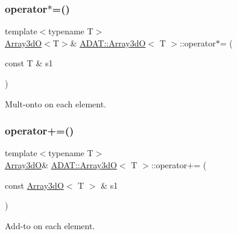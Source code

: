 \subsubsection{\texorpdfstring{operator$\ast$=()}{operator*=()}\hspace{0.1cm}{\footnotesize\ttfamily [6/6]}}
{\footnotesize\ttfamily template$<$typename T$>$ \\
\mbox{\hyperlink{classADAT_1_1Array3dO}{Array3dO}}$<$T$>$\& \mbox{\hyperlink{classADAT_1_1Array3dO}{A\+D\+A\+T\+::\+Array3dO}}$<$ T $>$\+::operator$\ast$= (\begin{DoxyParamCaption}\item[{const T \&}]{s1 }\end{DoxyParamCaption})\hspace{0.3cm}{\ttfamily [inline]}}



Mult-\/onto on each element. 

\mbox{\label{classADAT_1_1Array3dO_a5d72c8e7dd54897fe898b07616123229}} 
\subsubsection{\texorpdfstring{operator+=()}{operator+=()}\hspace{0.1cm}{\footnotesize\ttfamily [1/6]}}
{\footnotesize\ttfamily template$<$typename T$>$ \\
\mbox{\hyperlink{classADAT_1_1Array3dO}{Array3dO}}\& \mbox{\hyperlink{classADAT_1_1Array3dO}{A\+D\+A\+T\+::\+Array3dO}}$<$ T $>$\+::operator+= (\begin{DoxyParamCaption}\item[{const \mbox{\hyperlink{classADAT_1_1Array3dO}{Array3dO}}$<$ T $>$ \&}]{s1 }\end{DoxyParamCaption})\hspace{0.3cm}{\ttfamily [inline]}}



Add-\/to on each element. 

\mbox{\label{classADAT_1_1Array3dO_a5d72c8e7dd54897fe898b07616123229}} 
